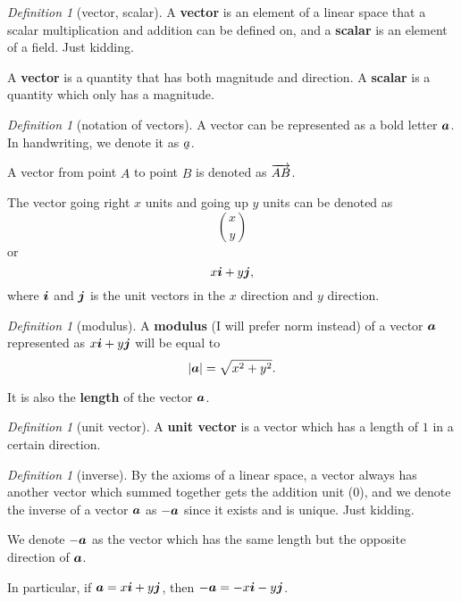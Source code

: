 \documentclass[8pt]{article}
\theoremstyle{remark}
\newtheorem{definition}[theorem]{Definition}
\begin{document}
        \begin{definition}[vector, scalar]
            A \textbf{vector} is an element of a linear space that a scalar multiplication and addition can be defined on, and a \textbf{scalar} is an element of a field. Just kidding.

            A \textbf{vector} is a quantity that has both magnitude and direction. A \textbf{scalar} is a quantity which only has a magnitude.
        \end{definition}

        \begin{definition}[notation of vectors]
            A vector can be represented as a bold letter $\boldsymbol{a}$. In handwriting, we denote it as $\underaccent{\tilde}{a}$.

            A vector from point $A$ to point $B$ is denoted as $\overrightarrow{AB}$.

            The vector going right $x$ units and going up $y$ units can be denoted as
            $$
                \binom{x}{y}
            $$
            or
            $$
                x\boldsymbol{i} + y\boldsymbol{j},
            $$
            where $\boldsymbol{i}$ and $\boldsymbol{j}$ is the unit vectors in the $x$ direction and $y$ direction.
        \end{definition}

        \begin{definition}[modulus]
            A \textbf{modulus} (I will prefer norm instead) of a vector $\boldsymbol{a}$ represented as $x\boldsymbol{i} + y\boldsymbol{j}$ will be equal to
            $$
                \left\lvert \boldsymbol{a} \right\rvert = \sqrt{x^2 + y^2}.
            $$

            It is also the \textbf{length} of the vector $\boldsymbol{a}$.
        \end{definition}

        \begin{definition}[unit vector]
            A \textbf{unit vector} is a vector which has a length of $1$ in a certain direction.
        \end{definition}

        \begin{definition}[inverse]
            By the axioms of a linear space, a vector always has another vector which summed together gets the addition unit (0), and we denote the inverse of a vector $\boldsymbol{a}$ as $-\boldsymbol{a}$ since it exists and is unique. Just kidding.

            We denote $-\boldsymbol{a}$ as the vector which has the same length but the opposite direction of $\boldsymbol{a}$.

            In particular, if $\boldsymbol{a} = x\boldsymbol{i} + y\boldsymbol{j}$, then $-\boldsymbol{a} = -x\boldsymbol{i} -y\boldsymbol{j}$.
        \end{definition}
\end{document}
